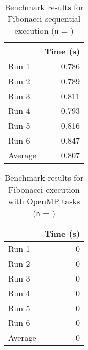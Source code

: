 \documentclass[12pt]{article}
\begin{document}
\begin{table}[H]
  \centering
  \begin{tabular}{lr}
    & {\bf Time (s)} \\
    \hline
    Run 1 & 0.786 \\
    Run 2 & 0.789 \\
    Run 3 & 0.811 \\
    Run 4 & 0.793 \\
    Run 5 & 0.816 \\
    Run 6 & 0.847 \\
    \hline
    Average & 0.807 \\
  \end{tabular}
  \caption{Benchmark results for Fibonacci sequential execution ({\tt n} = \fibNumber{})}
  \label{tbl-fib-sequential}
\end{table}

\begin{table}[H]
  \centering
  \begin{tabular}{lr}
    & {\bf Time (s)} \\
    \hline
    Run 1 & 0 \\
    Run 2 & 0 \\
    Run 3 & 0 \\
    Run 4 & 0 \\
    Run 5 & 0 \\
    Run 6 & 0 \\
    \hline
    Average & 0 \\
  \end{tabular}
  \caption{Benchmark results for Fibonacci execution with OpenMP tasks ({\tt n} = \fibNumber{})}
  \label{tbl-fib-tasks}
\end{table}

\end{document}
